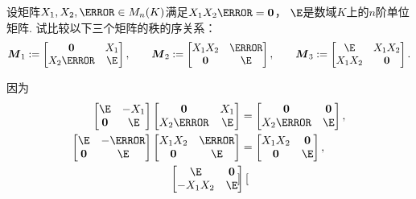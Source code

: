 \begin{example}
\def\M{\vb{M}}
设矩阵\(\A,\B,\C \in M_n(K)\)满足\(\A \B \C = \vb0\)，
\(\E\)是数域\(K\)上的\(n\)阶单位矩阵.
试比较以下三个矩阵的秩的序关系：\begin{equation*}
	\M_1 \defeq \begin{bmatrix}
		\vb0 & \A \\
		\B \C & \E
	\end{bmatrix},
	\qquad
	\M_2 \defeq \begin{bmatrix}
		\A \B & \C \\
		\vb0 & \E
	\end{bmatrix},
	\qquad
	\M_3 \defeq \begin{bmatrix}
		\E & \A \B \\
		\A \B & \vb0
	\end{bmatrix}.
\end{equation*}
\begin{solution}
因为\begin{align*}
	\begin{bmatrix}
		\E & -\A \\
		\vb0 & \E
	\end{bmatrix}
	\begin{bmatrix}
		\vb0 & \A \\
		\B \C & \E
	\end{bmatrix}
	&= \begin{bmatrix}
		\vb0 & \vb0 \\
		\B \C & \E
	\end{bmatrix}, \\
	\begin{bmatrix}
		\E & -\C \\
		\vb0 & \E
	\end{bmatrix}
	\begin{bmatrix}
		\A \B & \C \\
		\vb0 & \E
	\end{bmatrix}
	&= \begin{bmatrix}
		\A \B & \vb0 \\
		\vb0 & \E
	\end{bmatrix}, \\
	\begin{bmatrix}
		\E & \vb0 \\
		-\A \B & \E
	\end{bmatrix}
	\begin{bmatrix}

\end{bmatrix}
\end{align*}
\end{solution}
\end{example}
